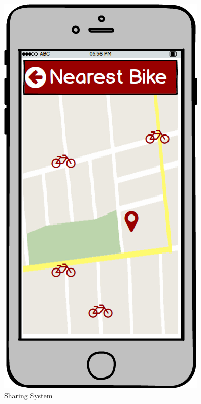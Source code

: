 \begin{figure}[!htb]
\begin{minipage}[b]{0.3\textwidth}
	\centering
	\includegraphics[scale=0.3]{images/SharingSystem}
	\caption{Sharing System}
	\label{ref:shared}
\end{minipage}
\hfill
\begin{minipage}[b]{0.3\textwidth}
	\centering

\end{minipage}
\end{figure}

